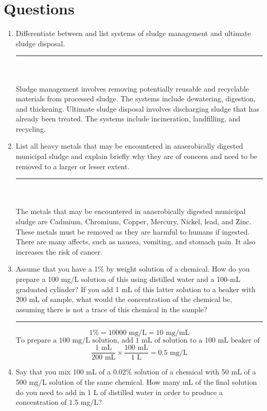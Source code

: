 \documentclass{article}
\begin{document}
    \section{Questions}
    \begin{enumerate}
        \item Differentiate between and list systems of sludge management and ultimate sludge disposal.
        \\\rule{5cm}{1pt}
        \\\\Sludge management involves removing potentially reusable and recyclable materials from processed sludge. The systems include dewatering, digestion, and thickening. Ultimate sludge disposal involves discharging sludge that has already been treated. The systems include incineration, landfilling, and recycling.
        \item List all heavy metals that may be encountered in anaerobically digested municipal sludge and explain briefly why they are of concern and need to be removed to a larger or lesser extent.
        \\\rule{5cm}{1pt}
        \\\\The metals that may be encountered in anaerobically digested municipal sludge are Cadmium, Chromium, Copper, Mercury, Nickel, lead, and Zinc. These metals must be removed as they are harmful to humans if ingested. There are many affects, such as nausea, vomiting, and stomach pain. It also increases the risk of cancer.
        \item Assume that you have a 1\% by weight solution of a chemical. How do you prepare a 100 mg/L solution of this using distilled water and a 100-mL graduated cylinder? If you add 1 mL of this latter solution to a beaker with 200 mL of sample, what would the concentration of the chemical be, assuming there is not a trace of this chemical in the sample?
        \\\rule{5cm}{1pt}
        \[1\%=10000\text{ mg/L}=10\text{ mg/mL}\]
        \[\boxed{\text{To prepare a 100 mg/L solution, add 1 mL of solution to a 100 mL beaker of distilled water.}}\]
        \[\frac{1 \text{ mL}}{200 \text{ mL}}\times\frac{100 \text{ mL}}{1 \text{ L}}=\boxed{0.5 \text{ mg/L}}\]
        \item Say that you mix 100 mL of a 0.02\% solution of a chemical with 50 mL of a 500 mg/L solution of the same chemical. How many mL of the final solution do you need to add in 1 L of distilled water in order to produce a concentration of 1.5 mg/L?

\end{enumerate}
\end{document}
